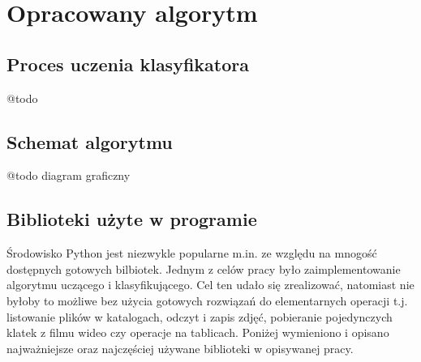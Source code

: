 %



\chapter{Opracowany algorytm}


\section{Proces uczenia klasyfikatora}
@todo


\section{Schemat algorytmu}
@todo
diagram graficzny


\section{Biblioteki użyte w programie}
Środowisko Python jest niezwykle popularne m.in. ze względu na mnogość dostępnych gotowych bilbiotek.
Jednym z celów pracy było zaimplementowanie algorytmu uczącego i klasyfikującego.
Cel ten udało się zrealizować, natomiast nie byłoby to możliwe bez użycia gotowych rozwiązań do elementarnych operacji t.j. listowanie plików w katalogach, odczyt i zapis zdjęć, pobieranie pojedynczych klatek z filmu wideo czy operacje na tablicach.
Poniżej wymieniono i opisano najważniejsze oraz najczęściej używane biblioteki w opisywanej pracy.

